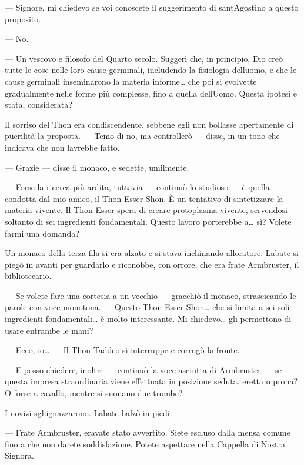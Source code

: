 --- Signore, mi chiedevo se voi conoscete il suggerimento di
sant\textquotesingle Agostino a questo proposito.

--- No.

--- Un vescovo e filosofo del Quarto secolo. Suggerì che, in principio,
Dio creò tutte le cose nelle loro cause germinali, includendo la
fisiologia dell\textquotesingle uomo, e che le cause germinali
inseminarono la materia informe\ldots{} che poi si evolvette
gradualmente nelle forme più complesse, fino a quella
dell\textquotesingle Uomo. Questa ipotesi è stata, considerata?

Il sorriso del Thon era condiscendente, sebbene egli non bollasse
apertamente di puerilità la proposta. --- Temo di no, ma controllerò ---
disse, in un tono che indicava che non l\textquotesingle avrebbe fatto.

--- Grazie --- disse il monaco, e sedette, umilmente.

--- Forse la ricerca più ardita, tuttavia --- continuò lo studioso --- è
quella condotta dal mio amico, il Thon Esser Shon. È un tentativo di
sintetizzare la materia vivente. Il Thon Esser spera di creare
protoplasma vivente, servendosi soltanto di sei ingredienti
fondamentali. Questo lavoro porterebbe a\ldots{} sì? Volete farmi una
domanda?

Un monaco della terza fila si era alzato e si stava inchinando
all\textquotesingle oratore. L\textquotesingle abate si piegò in avanti
per guardarlo e riconobbe, con orrore, che era frate Armbruster, il
bibliotecario.

--- Se volete fare una cortesia a un vecchio --- gracchiò il monaco,
strascicando le parole con voce monotona. --- Questo Thon Esser
Shon\ldots{} che si limita a sei soli ingredienti fondamentali\ldots{} è
molto interessante. Mi chiedevo\ldots{} gli permettono di usare entrambe
le mani?

--- Ecco, io\ldots{} --- Il Thon Taddeo si interruppe e corrugò la
fronte.

--- E posso chiedere, inoltre --- continuò la voce asciutta di
Armbruster --- se questa impresa straordinaria viene effettuata in
posizione seduta, eretta o prona? O forse a cavallo, mentre si suonano
due trombe?

I novizi sghignazzarono. L\textquotesingle abate balzò in piedi.

--- Frate Armbruster, eravate stato avvertito. Siete escluso dalla mensa
comune fino a che non darete soddisfazione. Potete aspettare nella
Cappella di Nostra Signora.

